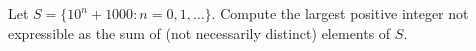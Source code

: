 Let $S = \{10^n + 1000: n = 0, 1, \dots\}$. Compute the largest positive integer not expressible as the sum of (not necessarily distinct) elements of $S$.
